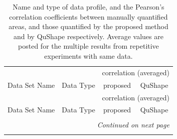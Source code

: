 \documentclass[letter]{bioinfo}
\begin{document}
\begin{center}
\begin{longtable}{lccc}

\caption{Name and type of data profile, and the Pearson's correlation coefficients between manually quantified areas, and those quantified by the proposed method and by QuShape respectively. Average values are posted for the multiple results from repetitive experiments with same data.} \\
 & & \multicolumn{2}{c}{correlation (averaged)} \\
Data Set Name & Data Type & proposed & QuShape \\\hline
\endfirsthead

 & & \multicolumn{2}{c}{correlation (averaged)} \\
Data Set Name & Data Type & proposed & QuShape \\\hline
\endhead

\\
\multicolumn{4}{r}{\textit{Continued on next page}} \\
\endfoot
\endlastfoot


\end{longtable}
\end{center}
\end{document}
